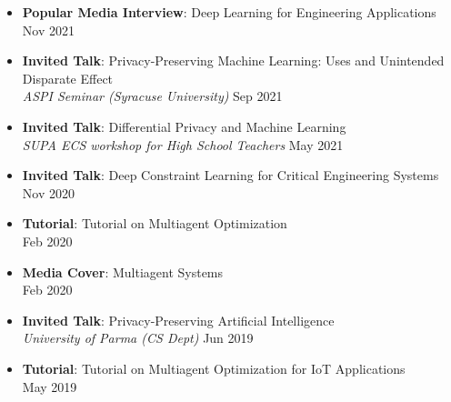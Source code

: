 \begin{itemize}
  \item {\bf Popular Media Interview}: 
  {Deep Learning for Engineering Applications}\\ 
   \hfill {Nov 2021}

  \item \textbf{Invited Talk}: 
  Privacy-Preserving Machine Learning: Uses and Unintended Disparate Effect\\
  {\em ASPI Seminar (Syracuse University)} 
  \hfill Sep 2021
	
  \item \textbf{Invited Talk}: 
  Differential Privacy and Machine Learning\\
  {\em SUPA ECS workshop for High School Teachers}
  \hfill May 2021


  \item {\bf Invited Talk}: Deep Constraint Learning for Critical Engineering Systems\\
  \hfill {Nov 2020}

  \item {\bf Tutorial}: {Tutorial on Multiagent Optimization}\\ 
  \hfill {Feb 2020}

  \item {\bf Media Cover}: {Multiagent Systems} \\
   \hfill{Feb 2020}

  \item {\bf Invited Talk}: 
  Privacy-Preserving Artificial Intelligence\\
  {\em University of Parma (CS Dept)} 
  \hfill {Jun 2019}

  \item {\bf Tutorial}: {Tutorial on Multiagent Optimization for IoT Applications}\\ 
  \hfill {May 2019}


\end{itemize}
